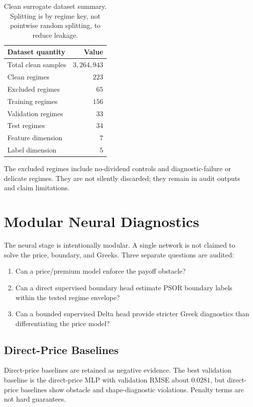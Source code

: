 \documentclass[11pt]{article}
\begin{document}
\begin{table}[h]
\centering
\small
\begin{tabular}{lr}
\toprule
Dataset quantity & Value \\
\midrule
Total clean samples & $3,264,943$ \\
Clean regimes & $223$ \\
Excluded regimes & $65$ \\
Training regimes & $156$ \\
Validation regimes & $33$ \\
Test regimes & $34$ \\
Feature dimension & $7$ \\
Label dimension & $5$ \\
\bottomrule
\end{tabular}
\caption{Clean surrogate dataset summary. Splitting is by regime key, not pointwise random splitting, to reduce leakage.}
\label{tab:dataset}
\end{table}

The excluded regimes include no-dividend controls and diagnostic-failure or delicate regimes. They are not silently discarded; they remain in audit outputs and claim limitations.

\section{Modular Neural Diagnostics}
The neural stage is intentionally modular. A single network is not claimed to solve the price, boundary, and Greeks. Three separate questions are audited:
\begin{enumerate}
  \item Can a price/premium model enforce the payoff obstacle?
  \item Can a direct supervised boundary head estimate PSOR boundary labels within the tested regime envelope?
  \item Can a bounded supervised Delta head provide stricter Greek diagnostics than differentiating the price model?
\end{enumerate}

\subsection{Direct-Price Baselines}
Direct-price baselines are retained as negative evidence. The best validation baseline is the direct-price MLP with validation RMSE about $0.0281$, but direct-price baselines show obstacle and shape-diagnostic violations. Penalty terms are not hard guarantees.
\end{document}
